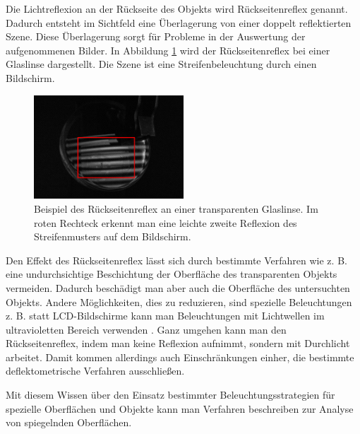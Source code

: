 \noindent
Die Lichtreflexion an der Rückseite des Objekts wird Rückseitenreflex genannt.
Dadurch entsteht im Sichtfeld eine Über\-la\-ge\-rung von einer doppelt reflektierten Szene.
Diese Über\-la\-ge\-rung sorgt für Probleme in der Auswertung der aufgenommenen Bilder.
In Abbildung \ref{img:rueckseitenreflexBeispiel} wird der Rückseitenreflex bei einer Glaslinse dargestellt.
Die Szene ist eine Streifenbeleuchtung durch einen Bildschirm.

\begin{figure}[H]
	\centering
	\includegraphics[width=0.5\textwidth]{02_grundlagenDerDeflektometrie/spiegelndeOberflaechen/figures/rueckseitenreflexBeispiel}
	\caption[Beispiel Rückseitenreflex]{Beispiel des Rückseitenreflex an einer transparenten Glaslinse. Im roten Rechteck erkennt man eine leichte zweite Reflexion des Streifenmusters auf dem Bildschirm.}
	\label{img:rueckseitenreflexBeispiel}
\end{figure}

\noindent
Den Effekt des Rückseitenreflex lässt sich durch bestimmte Verfahren wie z. B. eine undurchsichtige Beschichtung der Oberfläche des transparenten Objekts vermeiden.
Dadurch beschädigt man aber auch die Oberfläche des untersuchten Objekts.
Andere Mög\-lich\-keiten, dies zu reduzieren, sind spezielle Beleuchtungen z. B. statt LCD-Bildschirme kann man Beleuchtungen mit Lichtwellen im ultravioletten Bereich verwenden \cite{invisionUVDeflektometrie}.
Ganz umgehen kann man den Rückseitenreflex, indem man keine Reflexion aufnimmt, sondern mit Durchlicht arbeitet.
Damit kommen allerdings auch Einschränkungen einher, die bestimmte deflektometrische Verfahren ausschließen.

\p
Mit diesem Wissen über den Einsatz bestimmter Beleuchtungsstrategien für spezielle Oberflächen und Objekte kann man Verfahren beschreiben zur Analyse von spiegelnden Oberflächen.